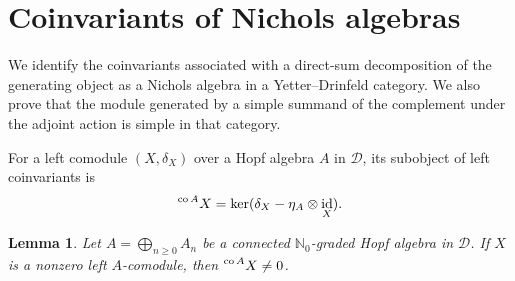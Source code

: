 \documentclass[11pt, a4paper]{article}
\numberwithin{equation}{section}
\newcommand{\D}{\mathcal D}
\DeclareMathOperator{\id}{id}
\DeclareMathOperator{\co}{co}
\newtheorem{lemma}[theorem]{Lemma}
\begin{document}
\section{Coinvariants of Nichols algebras}
\label{sec:coinvariants}
We identify the coinvariants associated with a direct-sum
decomposition of the generating object as a Nichols algebra
in a Yetter--Drinfeld category. We also prove that the module
generated by a simple summand of the complement under the
adjoint action is simple in that category.

For a left comodule $(X,\delta_X)$ over a Hopf algebra $A$ in $\D$,
its subobject of left coinvariants is
\[
 \prescript{\co A}{}{X}
 =\ker(\delta_X-\eta_A\otimes\id_X).
\]


\begin{lemma}\label{coinv:nonzero}
Let $A=\bigoplus_{n\geq 0}A_n$ be a connected $\mathbb{N}_0$-graded Hopf algebra
in $\D$. If $X$ is a nonzero left $A$-comodule, then
$\prescript{\co A}{}{X}\neq 0$.
\end{lemma}
\end{document}

